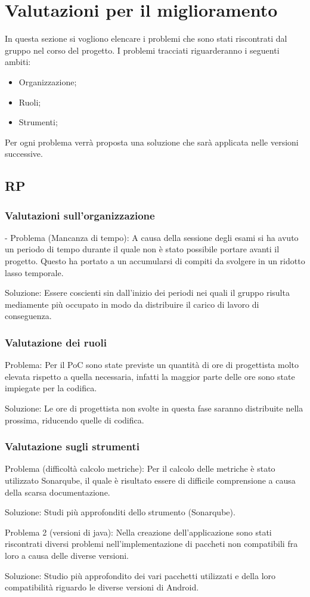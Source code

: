 \section{Valutazioni per il miglioramento}
In questa sezione si vogliono elencare i problemi che sono stati riscontrati dal gruppo nel corso del progetto.
I problemi tracciati riguarderanno i seguenti ambiti:
\begin{itemize}
\item Organizzazione;
\item Ruoli;
\item Strumenti;
\end{itemize}
Per ogni problema verrà proposta una soluzione che sarà applicata nelle versioni successive.

\subsection{RP}
\subsubsection{Valutazioni sull'organizzazione}
- Problema (Mancanza di tempo): A causa della sessione degli esami si ha avuto un periodo di tempo durante il quale non è stato possibile portare avanti il progetto. Questo ha portato a un accumularsi di compiti da svolgere in un ridotto lasso temporale.

Soluzione: Essere coscienti sin dall'inizio dei periodi nei quali il gruppo risulta mediamente più occupato in modo da distribuire il carico di lavoro di conseguenza. 

\subsubsection{Valutazione dei ruoli}

Problema: Per il PoC sono state previste un quantità di ore di progettista molto elevata rispetto a quella necessaria, infatti la maggior parte delle ore sono state impiegate per la codifica.

Soluzione: Le ore di progettista non svolte in questa fase saranno distribuite nella prossima, riducendo quelle di codifica.


\subsubsection{Valutazione sugli strumenti}

Problema (difficoltà calcolo metriche): Per il calcolo delle metriche è stato utilizzato Sonarqube, il quale è risultato essere di difficile comprensione a causa della scarsa documentazione.

Soluzione: Studi più approfonditi dello strumento (Sonarqube).

Problema 2 (versioni di java): Nella creazione dell'applicazione sono stati riscontrati diversi problemi nell'implementazione di paccheti non compatibili fra loro a causa delle diverse versioni.

Soluzione: Studio più approfondito dei vari pacchetti utilizzati e della loro compatibilità riguardo le diverse versioni di Android.


